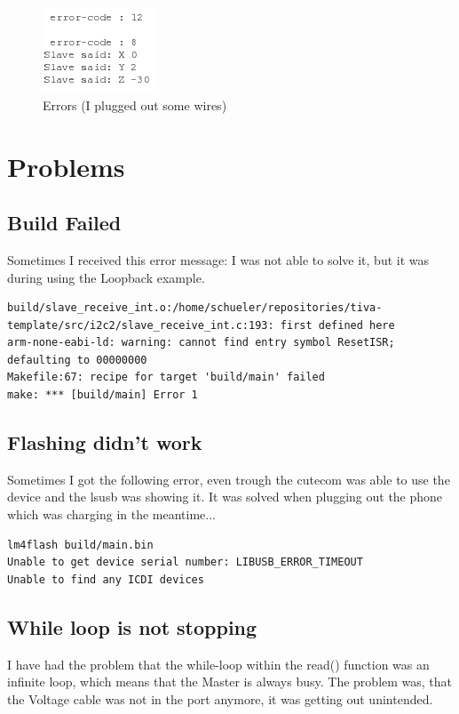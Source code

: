 \documentclass[12pt]{article}
\begin{document}
\begin{figure}[here!]
\centering
    \includegraphics[width=0.3\textwidth]{images/sc3}
    \caption{Errors (I plugged out some wires)}
    \label{fig:i2clayout}
\end{figure}
\FloatBarrier
\newpage
\section{Problems}
\subsection{Build Failed}
Sometimes I received this error message: I was not able to solve it, but it was during using the Loopback example.
\begin{lstlisting}    
build/slave_receive_int.o:/home/schueler/repositories/tiva-template/src/i2c2/slave_receive_int.c:193: first defined here
arm-none-eabi-ld: warning: cannot find entry symbol ResetISR; defaulting to 00000000
Makefile:67: recipe for target 'build/main' failed
make: *** [build/main] Error 1
\end{lstlisting}  
\subsection{Flashing didn't work}
Sometimes I got the following error, even trough the cutecom was able to use the device and the lsusb was showing it. It was solved when plugging out the phone which was charging in the meantime...
\begin{lstlisting}    
lm4flash build/main.bin
Unable to get device serial number: LIBUSB_ERROR_TIMEOUT
Unable to find any ICDI devices
\end{lstlisting}  
\subsection{While loop is not stopping}
I have had the problem that the while-loop within the read() function was an infinite loop, which means that the  Master is always busy. The problem was, that the Voltage cable was not in the port anymore, it was getting out unintended.
\end{document}
